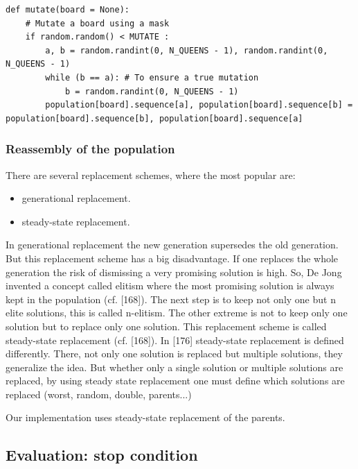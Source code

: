 
\begin{lstlisting}[label=sn:mutate, caption=Mutation function]
def mutate(board = None):
	# Mutate a board using a mask
	if random.random() < MUTATE :
		a, b = random.randint(0, N_QUEENS - 1), random.randint(0, N_QUEENS - 1)
		while (b == a): # To ensure a true mutation
			b = random.randint(0, N_QUEENS - 1)
		population[board].sequence[a], population[board].sequence[b] = population[board].sequence[b], population[board].sequence[a]
\end{lstlisting}

\subsubsection*{Reassembly of the population}\nocite{Zapfel2010}


There are several replacement schemes, where the most popular are:
\begin{itemize}
	\item generational replacement.
	\item steady-state replacement.
\end{itemize}

In generational replacement the new generation supersedes the old generation. But this replacement scheme has a big disadvantage. If one replaces the whole generation the risk of dismissing a very promising solution is high. So, De Jong invented a concept called elitism where the most promising solution is always kept in the population (cf. [168]). The next step is to keep not only one but n elite solutions, this is called n-elitism. The other extreme is not to keep only one solution but to replace only one solution. This replacement scheme is called steady-state replacement (cf. [168]). In [176] steady-state replacement is defined differently. There, not only one solution is replaced but multiple solutions, they generalize the idea. But whether only a single solution or multiple solutions are replaced, by using steady state replacement one must define which solutions are replaced (worst, random, double, parents...)

Our implementation uses steady-state replacement of the parents.

\subsection{Evaluation: stop condition}\label{sec:stop-cond}

